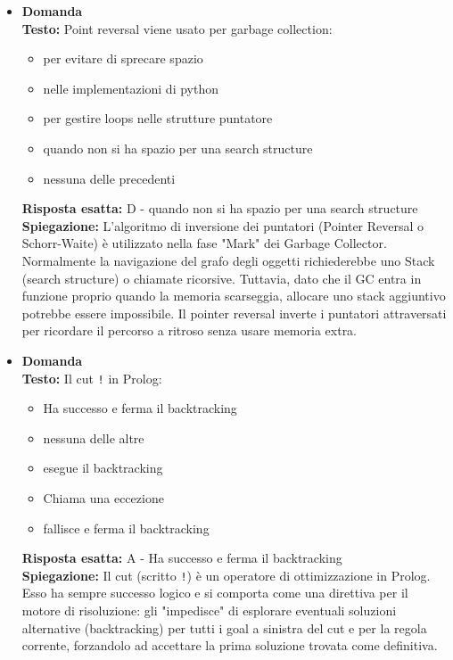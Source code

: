 \documentclass[12pt, a4paper]{article}
\newcounter{domandateoria}
\begin{document}
\begin{itemize}
    \item {}\textbf{Domanda \thedomandateoria} \\
    \textbf{Testo:} Point reversal viene usato per garbage collection:
    \begin{itemize}
        \item[A)] per evitare di sprecare spazio
        \item[B)] nelle implementazioni di python
        \item[C)] per gestire loops nelle strutture puntatore
        \item[D)] quando non si ha spazio per una search structure
        \item[E)] nessuna delle precedenti
    \end{itemize}
    \textbf{Risposta esatta:} D - quando non si ha spazio per una search structure \\
    \textbf{Spiegazione:} L'algoritmo di inversione dei puntatori (Pointer Reversal o Schorr-Waite) è utilizzato nella fase "Mark" dei Garbage Collector. Normalmente la navigazione del grafo degli oggetti richiederebbe uno Stack (search structure) o chiamate ricorsive. Tuttavia, dato che il GC entra in funzione proprio quando la memoria scarseggia, allocare uno stack aggiuntivo potrebbe essere impossibile. Il pointer reversal inverte i puntatori attraversati per ricordare il percorso a ritroso senza usare memoria extra.
    \vspace{0.3cm}

    \item {}\textbf{Domanda \thedomandateoria} \\
    \textbf{Testo:} Il cut \texttt{!} in Prolog:
    \begin{itemize}
        \item[A)] Ha successo e ferma il backtracking
        \item[B)] nessuna delle altre
        \item[C)] esegue il backtracking
        \item[D)] Chiama una eccezione
        \item[E)] fallisce e ferma il backtracking
    \end{itemize}
    \textbf{Risposta esatta:} A - Ha successo e ferma il backtracking \\
    \textbf{Spiegazione:} Il cut (scritto \texttt{!}) è un operatore di ottimizzazione in Prolog. Esso ha sempre successo logico e si comporta come una direttiva per il motore di risoluzione: gli "impedisce" di esplorare eventuali soluzioni alternative (backtracking) per tutti i goal a sinistra del cut e per la regola corrente, forzandolo ad accettare la prima soluzione trovata come definitiva.
    \vspace{0.3cm}


\end{itemize}
\end{document}
